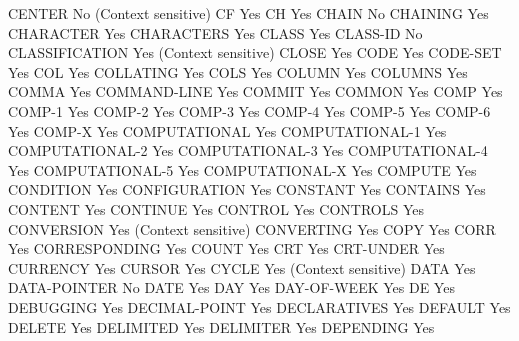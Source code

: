 CENTER                          No (Context sensitive)
CF                              Yes
CH                              Yes
CHAIN                           No
CHAINING                        Yes
CHARACTER                       Yes
CHARACTERS                      Yes
CLASS                           Yes
CLASS-ID                        No
CLASSIFICATION                  Yes (Context sensitive)
CLOSE                           Yes
CODE                            Yes
CODE-SET                        Yes
COL                             Yes
COLLATING                       Yes
COLS                            Yes
COLUMN                          Yes
COLUMNS                         Yes
COMMA                           Yes
COMMAND-LINE                    Yes
COMMIT                          Yes
COMMON                          Yes
COMP                            Yes
COMP-1                          Yes
COMP-2                          Yes
COMP-3                          Yes
COMP-4                          Yes
COMP-5                          Yes
COMP-6                          Yes
COMP-X                          Yes
COMPUTATIONAL                   Yes
COMPUTATIONAL-1                 Yes
COMPUTATIONAL-2                 Yes
COMPUTATIONAL-3                 Yes
COMPUTATIONAL-4                 Yes
COMPUTATIONAL-5                 Yes
COMPUTATIONAL-X                 Yes
COMPUTE                         Yes
CONDITION                       Yes
CONFIGURATION                   Yes
CONSTANT                        Yes
CONTAINS                        Yes
CONTENT                         Yes
CONTINUE                        Yes
CONTROL                         Yes
CONTROLS                        Yes
CONVERSION                      Yes (Context sensitive)
CONVERTING                      Yes
COPY                            Yes
CORR                            Yes
CORRESPONDING                   Yes
COUNT                           Yes
CRT                             Yes
CRT-UNDER                       Yes
CURRENCY                        Yes
CURSOR                          Yes
CYCLE                           Yes (Context sensitive)
DATA                            Yes
DATA-POINTER                    No
DATE                            Yes
DAY                             Yes
DAY-OF-WEEK                     Yes
DE                              Yes
DEBUGGING                       Yes
DECIMAL-POINT                   Yes
DECLARATIVES                    Yes
DEFAULT                         Yes
DELETE                          Yes
DELIMITED                       Yes
DELIMITER                       Yes
DEPENDING                       Yes
